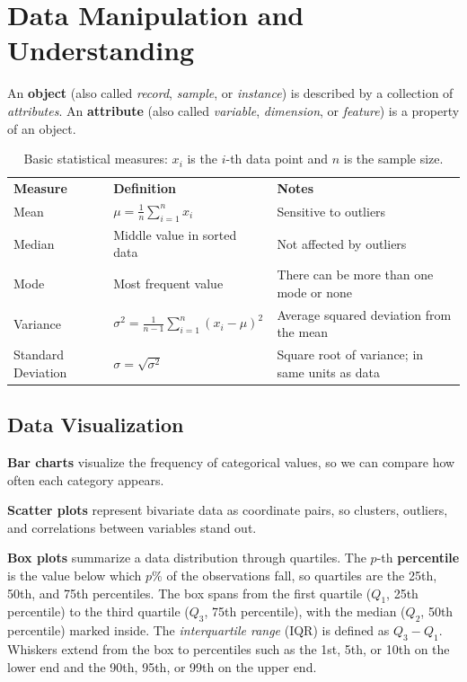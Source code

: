 \section{Data Manipulation and Understanding}
An \textbf{object} (also called \textit{record}, \textit{sample}, or \textit{instance}) is described by a collection of \textit{attributes}. An \textbf{attribute} (also called \textit{variable}, \textit{dimension}, or \textit{feature}) is a property of an object.
\begin{table}[H]
\centering
\footnotesize

\begin{tabular}{|p{2.8cm}p{4.5cm}p{7.5cm}|}
\hline
\textbf{Measure} & \textbf{Definition} & \textbf{Notes} \\
Mean & $\displaystyle \mu = \frac{1}{n} \sum_{i=1}^{n} x_i$ & Sensitive to outliers \\
Median & Middle value in sorted data & Not affected by outliers \\
Mode & Most frequent value & There can be more than one mode or none \\
Variance & $\displaystyle \sigma^2 = \frac{1}{n-1} \sum_{i=1}^{n} (x_i - \mu)^2$ & Average squared deviation from the mean \\
Standard Deviation & $\displaystyle \sigma = \sqrt{\sigma^2}$ & Square root of variance; in same units as data \\
\hline
\end{tabular}
\caption*{Basic statistical measures: $x_i$ is the $i$-th data point and $n$ is the sample size.}
\end{table}

\subsection{Data Visualization}
\textbf{Bar charts} visualize the frequency of categorical values, so we can compare how often each category appears.

\textbf{Scatter plots} represent bivariate data as coordinate pairs, so clusters, outliers, and correlations between variables stand out.

\textbf{Box plots} summarize a data distribution through quartiles. The $p$-th \textbf{percentile} is the value below which $p\%$ of the observations fall, so quartiles are the 25th, 50th, and 75th percentiles. The box spans from the first quartile ($Q_1$, 25th percentile) to the third quartile ($Q_3$, 75th percentile), with the median ($Q_2$, 50th percentile) marked inside. The \textit{interquartile range} (IQR) is defined as $Q_3 - Q_1$. Whiskers extend from the box to percentiles such as the 1st, 5th, or 10th on the lower end and the 90th, 95th, or 99th on the upper end.

